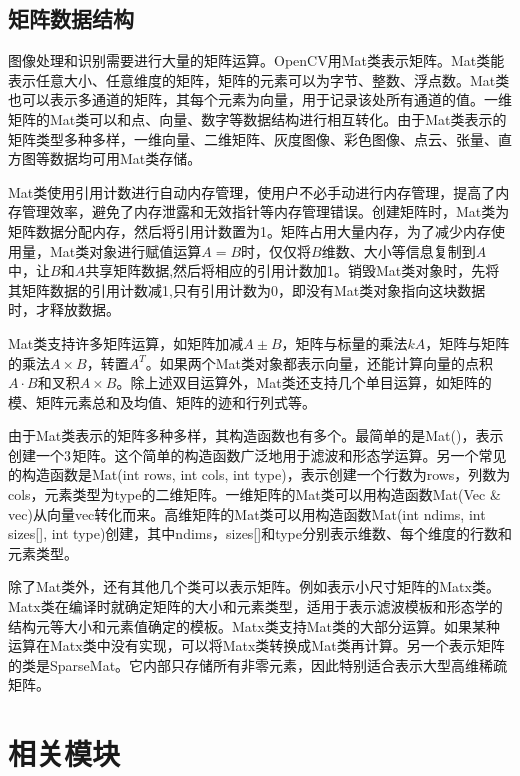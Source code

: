 \subsection{矩阵数据结构}


图像处理和识别需要进行大量的矩阵运算。OpenCV用Mat类表示矩阵。Mat类能表示任意大小、任意维度的矩阵，矩阵的元素可以为字节、整数、浮点数。Mat类也可以表示多通道的矩阵，其每个元素为向量，用于记录该处所有通道的值。一维矩阵的Mat类可以和点、向量、数字等数据结构进行相互转化。由于Mat类表示的矩阵类型多种多样，一维向量、二维矩阵、灰度图像、彩色图像、点云、张量、直方图等数据均可用Mat类存储。

Mat类使用引用计数进行自动内存管理，使用户不必手动进行内存管理，提高了内存管理效率，避免了内存泄露和无效指针等内存管理错误。创建矩阵时，Mat类为矩阵数据分配内存，然后将引用计数置为1。矩阵占用大量内存，为了减少内存使用量，Mat类对象进行赋值运算$A=B$时，仅仅将$B$维数、大小等信息复制到$A$中，让$B$和$A$共享矩阵数据,然后将相应的引用计数加1。销毁Mat类对象时，先将其矩阵数据的引用计数减1,只有引用计数为0，即没有Mat类对象指向这块数据时，才释放数据。

Mat类支持许多矩阵运算，如矩阵加减$A\pm B$，矩阵与标量的乘法$kA$，矩阵与矩阵的乘法$A\times B$，转置$A^T$。如果两个Mat类对象都表示向量，还能计算向量的点积$A\cdot B$和叉积$A\times B$。除上述双目运算外，Mat类还支持几个单目运算，如矩阵的模、矩阵元素总和及均值、矩阵的迹和行列式等。

由于Mat类表示的矩阵多种多样，其构造函数也有多个。最简单的是Mat()，表示创建一个$3\time 3$矩阵。这个简单的构造函数广泛地用于滤波和形态学运算。另一个常见的构造函数是Mat(int rows, int cols, int type)，表示创建一个行数为rows，列数为cols，元素类型为type的二维矩阵。一维矩阵的Mat类可以用构造函数Mat(Vec \& vec)从向量vec转化而来。高维矩阵的Mat类可以用构造函数Mat(int ndims, int sizes[], int type)创建，其中ndims，sizes[]和type分别表示维数、每个维度的行数和元素类型。

除了Mat类外，还有其他几个类可以表示矩阵。例如表示小尺寸矩阵的Matx类。Matx类在编译时就确定矩阵的大小和元素类型，适用于表示滤波模板和形态学的结构元等大小和元素值确定的模板。Matx类支持Mat类的大部分运算。如果某种运算在Matx类中没有实现，可以将Matx类转换成Mat类再计算。另一个表示矩阵的类是SparseMat。它内部只存储所有非零元素，因此特别适合表示大型高维稀疏矩阵。

\section{相关模块}

